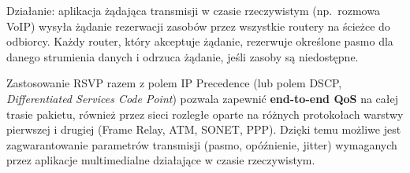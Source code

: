 \documentclass[12pt,a4paper]{article}
\begin{document}
Działanie: aplikacja żądająca transmisji w czasie rzeczywistym (np.\ rozmowa
VoIP) wysyła żądanie rezerwacji zasobów przez wszystkie routery na ścieżce do
odbiorcy. Każdy router, który akceptuje żądanie, rezerwuje określone pasmo
dla danego strumienia danych i odrzuca żądanie, jeśli zasoby są niedostępne.

Zastosowanie RSVP razem z polem IP Precedence (lub polem DSCP, \emph{Differentiated
Services Code Point}) pozwala zapewnić \textbf{end-to-end QoS} na całej
trasie pakietu, również przez sieci rozległe oparte na różnych protokołach
warstwy pierwszej i drugiej (Frame Relay, ATM, SONET, PPP). Dzięki temu
możliwe jest zagwarantowanie parametrów transmisji (pasmo, opóźnienie, jitter)
wymaganych przez aplikacje multimedialne działające w czasie rzeczywistym.
\end{document}
